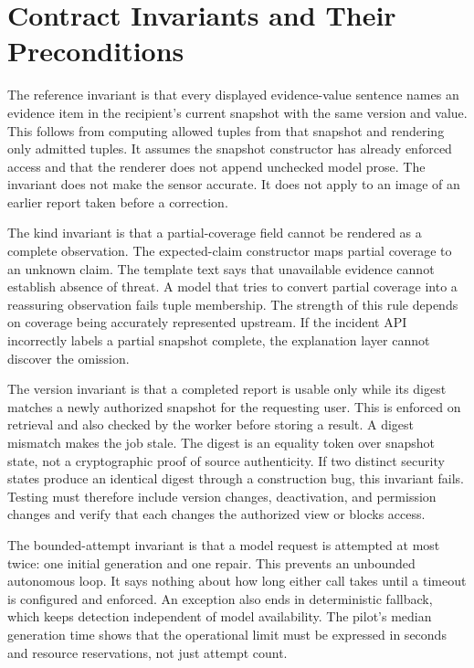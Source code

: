 \section{Contract Invariants and Their Preconditions}
The reference invariant is that every displayed evidence-value sentence names an evidence item in the recipient's current snapshot with the same version and value. This follows from computing allowed tuples from that snapshot and rendering only admitted tuples. It assumes the snapshot constructor has already enforced access and that the renderer does not append unchecked model prose. The invariant does not make the sensor accurate. It does not apply to an image of an earlier report taken before a correction.

The kind invariant is that a partial-coverage field cannot be rendered as a complete observation. The expected-claim constructor maps partial coverage to an unknown claim. The template text says that unavailable evidence cannot establish absence of threat. A model that tries to convert partial coverage into a reassuring observation fails tuple membership. The strength of this rule depends on coverage being accurately represented upstream. If the incident API incorrectly labels a partial snapshot complete, the explanation layer cannot discover the omission.

The version invariant is that a completed report is usable only while its digest matches a newly authorized snapshot for the requesting user. This is enforced on retrieval and also checked by the worker before storing a result. A digest mismatch makes the job stale. The digest is an equality token over snapshot state, not a cryptographic proof of source authenticity. If two distinct security states produce an identical digest through a construction bug, this invariant fails. Testing must therefore include version changes, deactivation, and permission changes and verify that each changes the authorized view or blocks access.

The bounded-attempt invariant is that a model request is attempted at most twice: one initial generation and one repair. This prevents an unbounded autonomous loop. It says nothing about how long either call takes until a timeout is configured and enforced. An exception also ends in deterministic fallback, which keeps detection independent of model availability. The pilot's median generation time shows that the operational limit must be expressed in seconds and resource reservations, not just attempt count.

